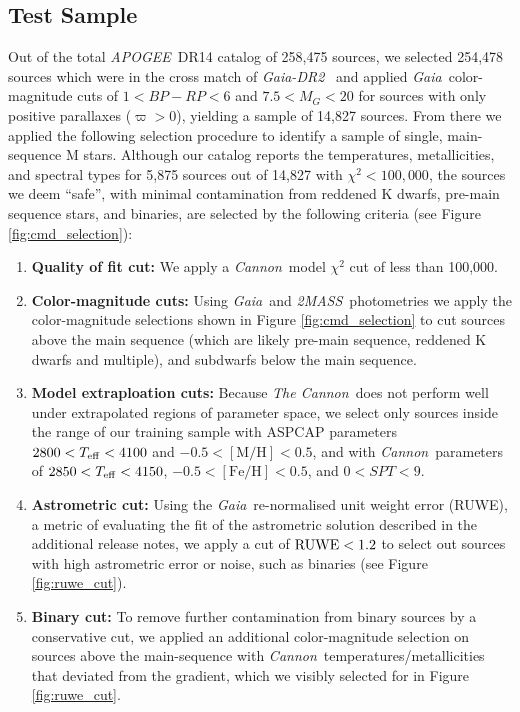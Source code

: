 \documentclass[twocolumn]{aastex62}
\newcommand{\apogee}{\textsl{APOGEE}}
\newcommand{\thecannon}{\textsl{The Cannon}}
\newcommand{\cannon}{\textsl{Cannon}}
\newcommand{\gaia}{\textsl{Gaia}}
\newcommand{\drtwo}{\textsl{Gaia-DR2}}
\newcommand{\zmass}{\textsl{2MASS}}
\newcommand{\feh}{[{\mathrm{Fe}/\mathrm{H}}]}
\newcommand{\mh}{[{\mathrm{M}/\mathrm{H}}]}
\begin{document}
\subsection{Test Sample \label{subsec:test_selection}} 

Out of the total \apogee\ DR14 catalog of 258,475 sources, we selected 254,478 sources which were in the cross match of \drtwo\ \citep{Brown:2018} and applied \gaia\ color-magnitude cuts of $1<BP-RP<6$ and $7.5<M_G<20$ for sources with only positive parallaxes ($\varpi>0$), yielding a sample of 14,827 sources. From there we applied the following selection procedure to identify a sample of single, main-sequence M stars. Although our catalog reports the temperatures, metallicities, and spectral types for 5,875 sources out of 14,827 with $\chi^2<100,000$, the sources we deem ``safe'', with minimal contamination from reddened K dwarfs, pre-main sequence stars, and binaries, are selected by the following criteria (see Figure \ref{fig:cmd_selection}):

\begin{enumerate}
\item \textbf{Quality of fit cut:} We apply a \cannon\ model $\chi^2$ cut of less than 100,000.

\item \textbf{Color-magnitude cuts:} Using \gaia\ and \zmass\ photometries we apply the color-magnitude selections shown in Figure \ref{fig:cmd_selection} to cut sources above the main sequence (which are likely pre-main sequence, reddened K dwarfs and multiple), and subdwarfs below the main sequence.

\item \textbf{Model extraploation cuts:} Because \thecannon\ does not perform well under extrapolated regions of parameter space, we select only sources inside the range of our training sample with ASPCAP parameters $2800<T_{\rm eff}<4100$ and $-0.5<\mh<0.5$, and with \cannon\ parameters of $2850<T_{\rm eff}<4150$, $-0.5<\feh<0.5$, and $0<SPT<9$.

\item \textbf{Astrometric cut:} Using the \gaia\ re-normalised unit weight error (RUWE), a metric of evaluating the fit of the astrometric solution described in the additional release notes, we apply a cut of ${\rm RUWE}<1.2$ to select out sources with high astrometric error or noise, such as binaries (see Figure \ref{fig:ruwe_cut}).

\item \textbf{Binary cut:} To remove further contamination from binary sources by a conservative cut, we applied an additional color-magnitude selection on sources above the main-sequence with \cannon\ temperatures/metallicities that deviated from the gradient, which we visibly selected for in Figure \ref{fig:ruwe_cut}.

\end{enumerate}
\end{document}
